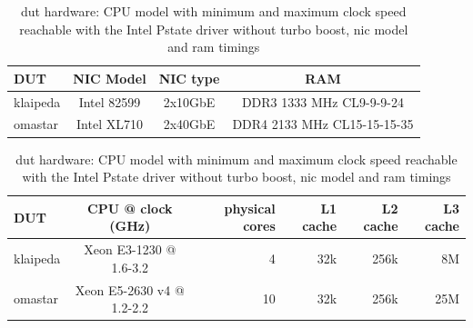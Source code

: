 \begin{table}[!ht]
	
	\vspace{3ex}
	\begin{tabular}[]{ l | c | c | c }
		DUT & NIC Model & NIC type & RAM \\ \hline
		klaipeda & Intel 82599 & 2x10GbE & DDR3 1333 MHz CL9-9-9-24 \\
		omastar & Intel XL710 & 2x40GbE & DDR4 2133 MHz CL15-15-15-35
	\end{tabular}

	\vspace{2ex}
	\begin{tabular}[]{ l | c | r | r | r | r }
		DUT & CPU @ clock (GHz) & physical cores & L1 cache & L2 cache & L3 cache \\ \hline
		klaipeda & Xeon E3-1230 @ 1.6-3.2 & 4 & 32k & 256k & 8M \\ %
		omastar & Xeon E5-2630 v4 @ 1.2-2.2 & 10 & 32k & 256k & 25M %
	\end{tabular}

	\caption{\Ac{dut} hardware: CPU model with minimum and maximum clock speed reachable with the Intel Pstate driver without turbo boost, \Ac{nic} model and \Ac{ram} timings}
	\label{table:hardware}
\end{table}




